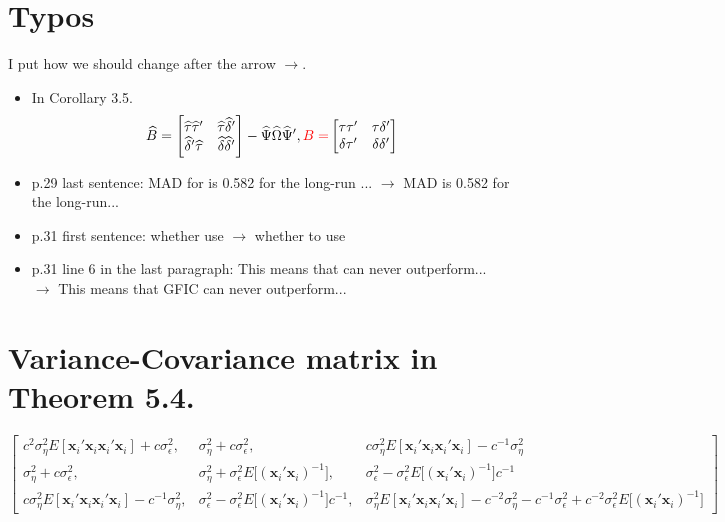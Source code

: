 \documentclass[11pt]{article}
\begin{document}



\doublespacing



\section*{Typos}

I put how we should change after the arrow $\rightarrow$. 

\begin{itemize}
\item In Corollary 3.5. 
\[
\widehat{B} = \begin{bmatrix}
\widehat{\tau} \widehat{\tau}' & \widehat{\tau} \widehat{\delta}'\\
\widehat{\delta}' \widehat{\tau}  & \widehat{\delta} \widehat{\delta}'
\end{bmatrix} - \widehat{\Psi} \widehat{\Omega} \widehat{\Psi}', \textcolor{red}{B=} \begin{bmatrix}
\tau \tau' & \tau \delta'\\
\delta \tau' & \delta \delta'
\end{bmatrix} 
\]
\item p.29 last sentence: MAD for is 0.582 for the long-run ... $\rightarrow$ MAD is 0.582 for the long-run...
\item p.31 first sentence: whether use $\rightarrow$ whether to use
\item p.31 line 6 in the last paragraph: This means that can never outperform... $\rightarrow$ This means that GFIC can never outperform...
\end{itemize}

\section*{Variance-Covariance matrix in Theorem 5.4.}
\vspace{0.2in}
\[
\begin{bmatrix}
c^2 \sigma_\eta^2 E[\mathbf{x}_i'\mathbf{x}_i \mathbf{x}_i' \mathbf{x}_i] + c \sigma_\epsilon^2, & \sigma_\eta^2 + c \sigma_\epsilon^2,   & c\sigma_\eta^2 E[\mathbf{x}_i' \mathbf{x}_i \mathbf{x}_i' \mathbf{x}_i] - c^{-1}\sigma_\eta^2  \\
\sigma_\eta^2 + c\sigma_\epsilon^2, & \sigma_\eta^2 + \sigma_\epsilon^2 E\big[  (\mathbf{x}_i' \mathbf{x}_i)^{-1} \big], & \sigma_\epsilon^2 - \sigma_\epsilon^2 E\big[(\mathbf{x}_i' \mathbf{x}_i)^{-1} \big] c^{-1}\\
 c \sigma_\eta^2 E[\mathbf{x}_i' \mathbf{x}_i \mathbf{x}_i' \mathbf{x}_i] - c^{-1}\sigma_\eta
^2 , & \sigma_\epsilon^2 - \sigma_\epsilon^2 E\big[(\mathbf{x}_i' \mathbf{x}_i)^{-1} \big] c^{-1}, & \sigma_\eta^2 E[\mathbf{x}_i' \mathbf{x}_i \mathbf{x}_i' \mathbf{x}_i]- c^{-2}\sigma_\eta^2  - c^{-1} \sigma_\epsilon^2 + c^{-2} \sigma_\epsilon^2 E\big[(\mathbf{x}_i' \mathbf{x}_i)^{-1}\big]
\end{bmatrix}
\]
\end{document}
